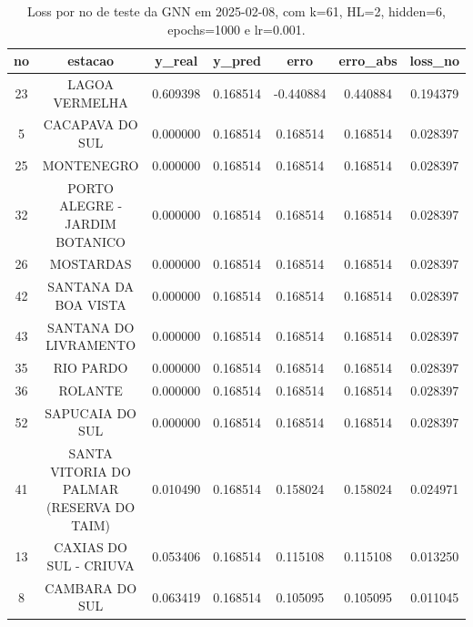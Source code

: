 \begin{table}[h]
\centering
\caption{Loss por no de teste da GNN em 2025-02-08, com k=61, HL=2, hidden=6, epochs=1000 e lr=0.001.}
\label{tab:gnn_loss_k61_hl2_h6_e1000_d20250208}
\begin{tabular}{ccccccc}
\toprule
no & estacao & y\_real & y\_pred & erro & erro\_abs & loss\_no \\
\midrule
23 & LAGOA VERMELHA & 0.609398 & 0.168514 & -0.440884 & 0.440884 & 0.194379 \\
5 & CACAPAVA DO SUL & 0.000000 & 0.168514 & 0.168514 & 0.168514 & 0.028397 \\
25 & MONTENEGRO & 0.000000 & 0.168514 & 0.168514 & 0.168514 & 0.028397 \\
32 & PORTO ALEGRE - JARDIM BOTANICO & 0.000000 & 0.168514 & 0.168514 & 0.168514 & 0.028397 \\
26 & MOSTARDAS & 0.000000 & 0.168514 & 0.168514 & 0.168514 & 0.028397 \\
42 & SANTANA DA BOA VISTA & 0.000000 & 0.168514 & 0.168514 & 0.168514 & 0.028397 \\
43 & SANTANA DO LIVRAMENTO & 0.000000 & 0.168514 & 0.168514 & 0.168514 & 0.028397 \\
35 & RIO PARDO & 0.000000 & 0.168514 & 0.168514 & 0.168514 & 0.028397 \\
36 & ROLANTE & 0.000000 & 0.168514 & 0.168514 & 0.168514 & 0.028397 \\
52 & SAPUCAIA DO SUL & 0.000000 & 0.168514 & 0.168514 & 0.168514 & 0.028397 \\
41 & SANTA VITORIA DO PALMAR (RESERVA DO TAIM) & 0.010490 & 0.168514 & 0.158024 & 0.158024 & 0.024971 \\
13 & CAXIAS DO SUL - CRIUVA & 0.053406 & 0.168514 & 0.115108 & 0.115108 & 0.013250 \\
8 & CAMBARA DO SUL & 0.063419 & 0.168514 & 0.105095 & 0.105095 & 0.011045 \\
\bottomrule
\end{tabular}
\end{table}

